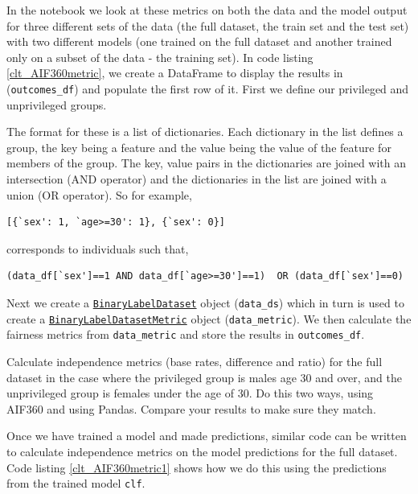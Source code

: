 In the notebook we look at these metrics on both the data and the model output for three different sets of the data (the full dataset, the train set and the test set) with two different models (one trained on the full dataset and another trained only on a subset of the data - the training set). In code listing \ref{clt_AIF360metric}, we create a DataFrame to display the results in (\texttt{outcomes\_df}) and populate the first row of it. First we define our privileged and unprivileged groups.
%
\begin{lookbox}
The format for these is a list of dictionaries. Each dictionary in the list defines a group, the key being a feature and the value being the value of the feature for members of the group. The key, value pairs in the dictionaries are joined with an intersection (AND operator) and the dictionaries in the list are joined with a union (OR operator). So for example,
%
\begin{lstlisting}
[{`sex': 1, `age>=30': 1}, {`sex': 0}]
\end{lstlisting}
%
\noindent
corresponds to individuals such that,
%
\begin{lstlisting}
(data_df[`sex']==1 AND data_df[`age>=30']==1)  OR (data_df[`sex']==0)
\end{lstlisting}
\end{lookbox}

Next we create a \href{https://aif360.readthedocs.io/en/latest/modules/generated/aif360.datasets.BinaryLabelDataset.html#aif360.datasets.BinaryLabelDataset}{\texttt{BinaryLabelDataset}} object (\texttt{data\_ds}) which in turn is used to create a \href{https://aif360.readthedocs.io/en/latest/modules/generated/aif360.metrics.BinaryLabelDatasetMetric.html#aif360.metrics.BinaryLabelDatasetMetric}{\texttt{BinaryLabelDatasetMetric}} object (\texttt{data\_metric}). We then calculate the fairness metrics from \texttt{data\_metric} and store the results in \texttt{outcomes\_df}.

\begin{lookbox}
Calculate independence metrics (base rates, difference and ratio) for the full dataset in the case where the privileged group is males age 30 and over, and the unprivileged group is females under the age of 30. Do this two ways, using AIF360 and using Pandas. Compare your results to make sure they match.
\end{lookbox}

Once we have trained a model and made predictions, similar code can be written to calculate independence metrics on the model predictions for the full dataset. Code listing \ref{clt_AIF360metric1} shows how we do this using the predictions from the trained model \texttt{clf}.

